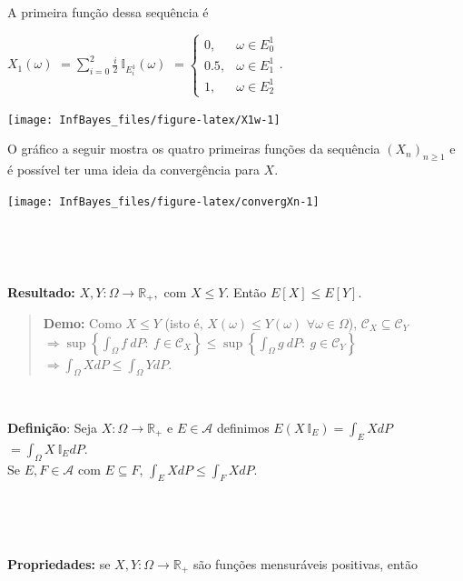 \documentclass[
]{book}
\begin{document}
\(~\)

A primeira função dessa sequência é

\(X_1(\omega)\)
\(= \displaystyle\sum_{i=0}^2 \frac{i}{2}~\mathbb{I}_{{E}_i^1}(\omega)\)
\(=\displaystyle\left\{\begin{array}{ll}0,&\omega\in{E}_0^1\\ 0.5,&\omega\in{E}_1^1\\1,&\omega\in{E}_2^1 \end{array}\right.\).

\begin{center}\texttt{[image: InfBayes\_files/figure-latex/X1w-1]} \end{center}

O gráfico a seguir mostra os quatro primeiras funções da sequência \(\left(X_n\right)_{n\geq 1}\) e é possível ter uma ideia da convergência para \(X\).

\begin{center}\texttt{[image: InfBayes\_files/figure-latex/convergXn-1]} \end{center}

\(~\)

\(~\)

\textbf{Resultado:} \(X,Y: \Omega \longrightarrow\mathbb{R}_+,\) com \(X\leq Y\). Então \(E[X] \leq E[Y]\).

\begin{quote}
\textbf{Demo:} Como \(X \leq Y\) (isto é, \(X(\omega) \leq Y(\omega)\) \(\forall \omega \in \Omega\)), \(\mathcal{C}_X \subseteq \mathcal{C}_Y\)\\
\(\Rightarrow \sup\left\{\displaystyle\int_\Omega f~dP:~ f\in \mathcal{C}_X\right\} \leq \sup\left\{\displaystyle\int_\Omega g~dP:~ g\in \mathcal{C}_Y\right\}\) \(\Rightarrow \displaystyle\int_\Omega XdP \leq \displaystyle\int_\Omega YdP\).
\end{quote}

\(~\)

\textbf{Definição}: Seja \(X:\Omega \longrightarrow\mathbb{R}_+\) e \(E \in \mathcal{A}\) definimos \(E(X~\mathbb{I}_E) = \displaystyle\int_EXdP\) \(=\displaystyle\int_\Omega X~\mathbb{I}_EdP\).\\
Se \(E,F \in \mathcal{A}\) com \(E\subseteq F\), \(\displaystyle\int_E XdP \leq \int_F XdP.\)

\(~\)

\(~\)

\textbf{Propriedades:} se \(X, Y: \Omega \longrightarrow \mathbb{R}_+\) são funções mensuráveis positivas, então
\end{document}
